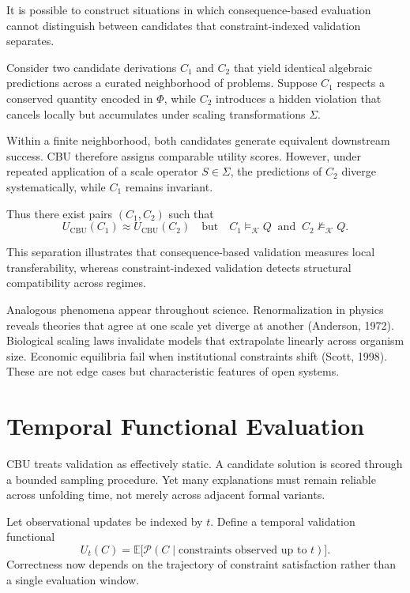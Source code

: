 \documentclass[11pt]{article}
\begin{document}
It is possible to construct situations in which consequence-based evaluation cannot distinguish between candidates that constraint-indexed validation separates.

Consider two candidate derivations \(C_1\) and \(C_2\) that yield identical algebraic predictions across a curated neighborhood of problems. Suppose \(C_1\) respects a conserved quantity encoded in \(\Phi\), while \(C_2\) introduces a hidden violation that cancels locally but accumulates under scaling transformations \(\Sigma\).

Within a finite neighborhood, both candidates generate equivalent downstream success. CBU therefore assigns comparable utility scores. However, under repeated application of a scale operator \(S \in \Sigma\), the predictions of \(C_2\) diverge systematically, while \(C_1\) remains invariant.

Thus there exist pairs \((C_1, C_2)\) such that
\[
U_{\mathrm{CBU}}(C_1) \approx U_{\mathrm{CBU}}(C_2)
\quad \text{but} \quad
C_1 \models_{\mathcal{K}} Q \;\; \text{and} \;\; C_2 \not\models_{\mathcal{K}} Q.
\]

This separation illustrates that consequence-based validation measures local transferability, whereas constraint-indexed validation detects structural compatibility across regimes.

Analogous phenomena appear throughout science. Renormalization in physics reveals theories that agree at one scale yet diverge at another (Anderson, 1972). Biological scaling laws invalidate models that extrapolate linearly across organism size. Economic equilibria fail when institutional constraints shift (Scott, 1998). These are not edge cases but characteristic features of open systems.

\section{Temporal Functional Evaluation}

CBU treats validation as effectively static. A candidate solution is scored through a bounded sampling procedure. Yet many explanations must remain reliable across unfolding time, not merely across adjacent formal variants.

Let observational updates be indexed by \(t\). Define a temporal validation functional
\[
U_t(C) = \mathbb{E}\bigl[\mathcal{P}(C \mid \text{constraints observed up to } t)\bigr].
\]
Correctness now depends on the trajectory of constraint satisfaction rather than a single evaluation window.
\end{document}
